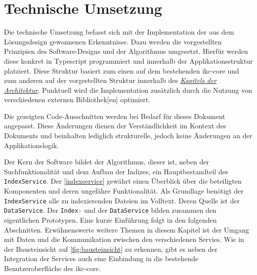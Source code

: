 \chapter{Technische Umsetzung} \label{implementation}

Die technische Umsetzung befasst sich mit der Implementation der aus dem Lösungsdesign gewonnenen Erkenntnisse. Dazu werden die vorgestellten Prinzipien des Software-Designs und der Algorithmus umgesetzt. Hierfür werden diese konkret in \gls{Typescript} programmiert und innerhalb der Applikationsstruktur platziert. Diese Struktur basiert zum einen auf dem bestehenden \gls{ikc-core} und zum anderen auf der vorgestellten Struktur innerhalb des \hyperref[arcitecture]{\textit{Kapitels der Architektur}}. Punktuell wird die Implementation zusätzlich durch die Nutzung von verschiedenen externen \gls{Bibliothek}[en] optimiert.

Die gezeigten Code-Ausschnitten werden bei Bedarf für dieses Dokument angepasst. Diese Änderungen dienen der Verständlichkeit im Kontext des Dokuments und beinhalten lediglich strukturelle, jedoch keine Änderungen an der Applikationslogik.






Der Kern der Software bildet der Algorithmus, dieser ist, neben der Suchfunktionalität und dem Aufbau der Indizes, ein Hauptbestandteil des \texttt{IndexService}. Der \autoref{indexservice} gewährt einen Überblick über die beteiligten Komponenten und deren ungefähre Funktionalität. Als Grund\-la\-ge benötigt der \texttt{In\-dex\-Ser\-vice} alle zu indexierenden Dateien im Volltext. Deren Quelle ist der \texttt{Data\-Ser\-vice}. Der \texttt{Index-} und der \texttt{Da\-ta\-Ser\-vi\-ce} bilden zusammen den eigentlichen Prototypen. Eine kurze Einführung folgt in den folgenden Abschnitten. Er\-wähn\-ens\-wer\-te weitere Themen in diesem Kapitel ist der Umgang mit Daten und die Kommunikation zwischen den verschiedenen Servies. Wie in der Bausteinsicht auf \autoref{fig:bausteinsicht} zu erkennen, gibt es neben der Integration der Services auch eine Einbindung in die bestehende Benutzeroberfläche des \gls{ikc-core}.

